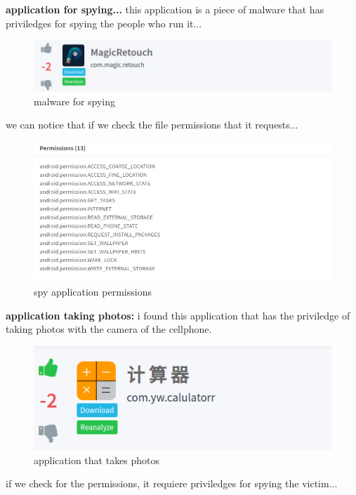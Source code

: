 \documentclass[10pt,a4paper]{article} %
\begin{document}
        \newpage
        \textbf{application for spying...}
        this application is a piece of malware that has priviledges for spying the people who run it...
        \begin{figure}[h!]
            \centering
            \includegraphics[width=0.8\linewidth]{spy.png}
            \caption{malware for spying}
            \label{spy}
        \end{figure}
        we can notice that if we check the file permissions that it requests...
        \begin{figure}[h!]
            \centering
            \includegraphics[width=0.8\linewidth]{spyper.png}
            \caption{spy application permissions}
            \label{fig}
        \end{figure}
        \newpage
        \textbf{application taking photos:}
        i found this application that has the priviledge of taking photos with
        the camera of the cellphone.
        \begin{figure}[h!]
            \centering
            \includegraphics[width=0.8\linewidth]{photos.png}
            \caption{application that takes photos}
            \label{fotos}
        \end{figure}
        if we check for the permissions, it requiere priviledges for spying the
        victim...
\end{document}
